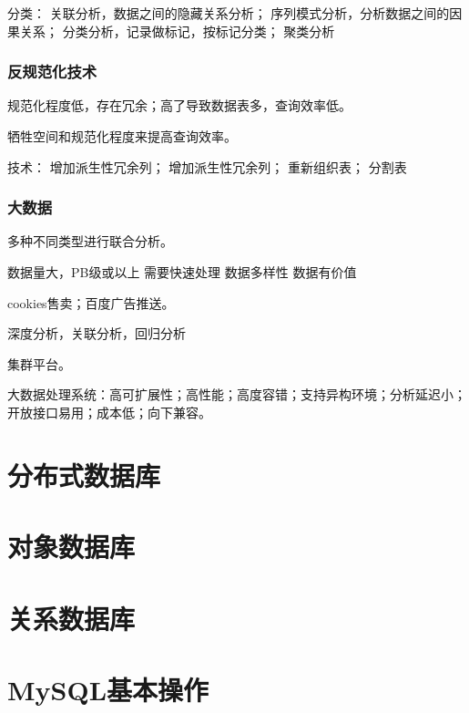 \documentclass[UTF8]{../computerUniverse}
\begin{document}
分类：
关联分析，数据之间的隐藏关系分析；
序列模式分析，分析数据之间的因果关系；
分类分析，记录做标记，按标记分类；
聚类分析


\subsubsection{反规范化技术}
规范化程度低，存在冗余；高了导致数据表多，查询效率低。

牺牲空间和规范化程度来提高查询效率。

技术：
增加派生性冗余列；
增加派生性冗余列；
重新组织表；
分割表


\subsubsection{大数据}
多种不同类型进行联合分析。

数据量大，PB级或以上
需要快速处理
数据多样性
数据有价值

cookies售卖；百度广告推送。

深度分析，关联分析，回归分析

集群平台。

大数据处理系统：高可扩展性；高性能；高度容错；支持异构环境；分析延迟小；开放接口易用；成本低；向下兼容。


    \section{分布式数据库}
    \section{对象数据库}
    \section{关系数据库}

    \section{MySQL基本操作}
\end{document}
